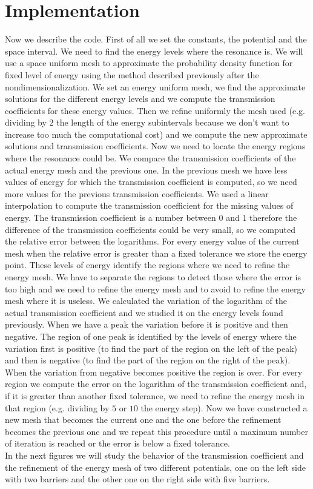 \documentclass[12pt,a4paper,onecolumn]{article}
\theoremstyle{definition}
\theoremstyle{plain}
\begin{document}
\section{Implementation}
Now we describe the code. First of all we set the constants, the potential and the space interval. We need to find the energy levels where the resonance is. We will use a space uniform mesh to approximate the probability density function for fixed level of energy using the method described previously after the nondimensionalization. We set an energy uniform mesh, we find the approximate solutions for the different energy  levels and we compute the transmission coefficients for these energy values. Then we refine uniformly the mesh used (e.g. dividing by $2$ the length of the energy subintervals because we don't want to increase too much the computational cost) and we compute the new approximate solutions and transmission coefficients.  Now we need to locate the energy regions where the resonance could be. We compare the transmission coefficients of the actual energy mesh and the previous one. In the previous mesh we have less values of energy for which the transmission coefficient is computed, so we need more values for the previous transmission coefficients. We used a linear interpolation to compute the transmission coefficient for the missing values of energy. The transmission coefficient is a number between $0$ and $1$ therefore the difference of the transmission coefficients could be very small, so we computed the relative error between the logarithms. For every energy value of the current mesh when the relative error is greater than a fixed tolerance we store the energy point. These levels of energy identify the regions where we need to refine the energy mesh. We have to separate the regions to detect those where the error is too high and we need to refine the energy mesh and to avoid to refine the energy mesh where it is useless. We calculated the variation of the logarithm of the actual transmission coefficient and we studied it on the energy levels found previously. When we have a peak the variation before it is positive and then negative. The region of one peak is identified by the levels of energy where the variation first is positive (to find the part of the region on the left of the peak) and then is negative (to find the part of the region on the right of the peak). When the variation from negative becomes positive the region is over. For every region we compute the error on the logarithm of the transmission coefficient and, if it is greater than another fixed tolerance, we need to refine the energy mesh in that region (e.g. dividing by $5$ or $10$ the energy step). Now we have constructed a new mesh that becomes the current one and the one before the refinement becomes the previous one and we repeat this procedure until a maximum number of iteration is reached or the error is below a fixed tolerance.\\
In the next figures we will study the behavior of the transmission coefficient and the refinement of the energy mesh of two different potentials, one on the left side with two barriers and the other one on the right side with five barriers.
\end{document}
